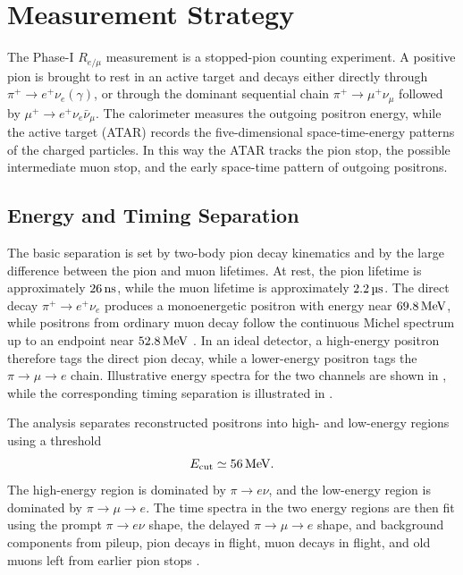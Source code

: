 \section{Measurement Strategy}
\label{sec:measurement-strategy}

The Phase-I \(R_{e/\mu}\) measurement is a stopped-pion counting experiment.
A positive pion is brought to rest in an active target and decays either
directly through \(\pi^{+}\to e^{+}\nu_e(\gamma)\), or through the dominant
sequential chain \(\pi^{+}\to\mu^{+}\nu_\mu\) followed by
\(\mu^{+}\to e^{+}\nu_e\bar{\nu}_\mu\). The calorimeter measures the outgoing
positron energy, while the active target (ATAR) records the five-dimensional space-time-energy
patterns of the charged particles. In this way the ATAR tracks the pion stop, the possible
intermediate muon stop, and the early space-time pattern of outgoing positrons.

\subsection{Energy and Timing Separation}
\label{subsec:measurement-energy-timing}

The basic separation is set by two-body pion decay kinematics and by the
large difference between the pion and muon lifetimes. At rest, the pion
lifetime is approximately \(\SI{26}{\nano\second}\), while the muon
lifetime is approximately \(\SI{2.2}{\micro\second}\). The direct decay
\(\pi^{+}\to e^{+}\nu_e\) produces a monoenergetic positron with energy near
\(\SI{69.8}{\mega\electronvolt}\), while positrons from ordinary muon
decay follow the continuous Michel spectrum up to an endpoint near
\(\SI{52.8}{\mega\electronvolt}\) \cite{PDG2024}. In an ideal detector,
a high-energy positron therefore tags the direct pion decay, while a
lower-energy positron tags the \(\pi\to\mu\to e\) chain. Illustrative energy
spectra for the two channels are shown in
, while the corresponding timing
separation is illustrated in
.

The analysis separates reconstructed positrons into high- and low-energy
regions using a threshold
\begin{equation}
  E_{\mathrm{cut}} \simeq \SI{56}{\mega\electronvolt}.
\end{equation}
The high-energy region is dominated by \(\pi\to e\nu\), and the low-energy
region is dominated by \(\pi\to\mu\to e\). The time spectra in the two energy regions are then fit using the prompt
\(\pi\to e\nu\) shape, the delayed \(\pi\to\mu\to e\) shape, and background
components from pileup, pion decays in flight, muon decays in flight, and old
muons left from earlier pion stops \cite{pioneer_proposal_2022,pioneer_rare_2022}.


